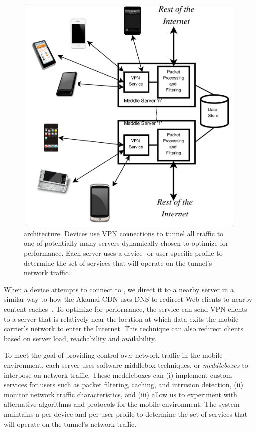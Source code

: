 \begin{figure}
\centering
        \includegraphics[width=0.8\linewidth]{figs/meddle-servers.pdf}
\vspace{\figcapspace}
  \caption{\meddle architecture. Devices use VPN connections to tunnel all 
  traffic to one of potentially many \meddle servers dynamically chosen to 
  optimize for performance. Each \meddle server uses a device- or user-specific 
  profile to determine the set of services that will operate on the tunnel's network traffic.}
  \label{fig:arch}
\vspace{\postfigspace}
\end{figure}

When a device attempts to connect to \meddle, we direct it to a nearby 
\meddle server in a similar way to how the Akamai CDN uses DNS to redirect 
Web clients to nearby content caches~\cite{akamai:cdn}. 
To optimize for performance, the service can send VPN clients to a 
server that is relatively near the location at which data exits
the mobile carrier's network to enter the Internet. This technique 
can also redirect clients based on server load, reachability and availability. 

To meet the goal of providing control over network traffic in the mobile 
environment, each \meddle
server uses software-middlebox techniques, or \emph{meddleboxes} to interpose on 
network traffic. These meddleboxes can (i) implement custom services for users such as packet
filtering, caching, and intrusion detection, (ii) monitor network
traffic characteristics, and (iii) allow us to experiment with alternative
algorithms and protocols for the mobile environment.
The system maintains a per-device and per-user profile 
to determine the set of services that will operate on the tunnel's 
network traffic. 

